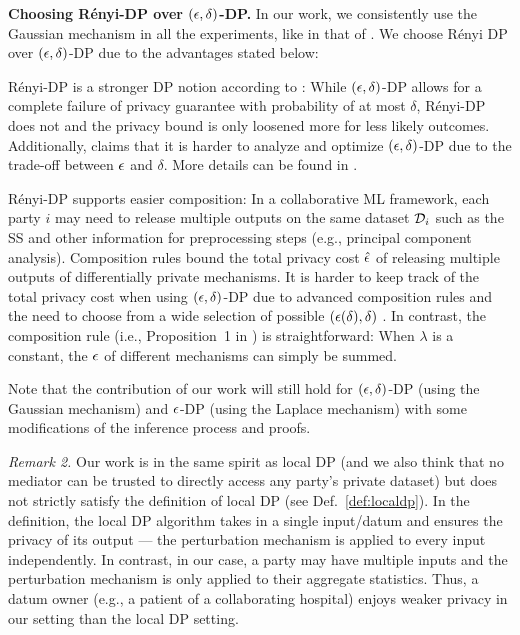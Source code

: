 \documentclass{article}
\theoremstyle{plain}
\theoremstyle{definition}
\theoremstyle{remark}
\renewcommand{\citet}[1]{\cite{#1}}
\begin{document}
\textbf{Choosing  R{\'e}nyi-DP over $({\epsilon}, \delta)$-DP.}
In our work, we consistently use the Gaussian mechanism in all the experiments, like in that of \citet{kulkarni2021glm}. We choose R{\'e}nyi DP over $({\epsilon}, \delta)$-DP due to the advantages stated below:

\squishlisttwo
    \item R{\'e}nyi-DP is a stronger DP notion according to \citet{mironov2017renyi}: While $({\epsilon}, \delta)$-DP allows for a complete failure of privacy guarantee with probability of at most $\delta$, R{\'e}nyi-DP does not and the privacy bound is only loosened more for less likely outcomes. Additionally, \citet{mironov2017renyi} claims that it is harder to analyze and optimize $({\epsilon}, \delta)$-DP due to the trade-off between ${\epsilon}$ and $\delta$. More details can be found in \cite{mironov2017renyi}.
    \item  R{\'e}nyi-DP supports easier composition: In a collaborative ML framework, each party $i$ may need to release multiple outputs on the same dataset ${\mathcal{D}}_i$ such as the SS and other information for preprocessing steps (e.g.,  principal component analysis). Composition rules bound the total privacy cost $\hat{{\epsilon}}$ of releasing multiple outputs of differentially private mechanisms. It is harder to keep track of the total privacy cost when using $({\epsilon}, \delta)$-DP due to advanced composition rules and the need to choose from a wide selection of possible $({\epsilon}(\delta), \delta)$  \cite{mironov2017renyi}. In contrast, the composition rule (i.e., Proposition~1 in \cite{mironov2017renyi}) is straightforward: When $\lambda$ is a constant, the ${\epsilon}$ of different mechanisms can simply be summed.
\squishend

Note that the contribution of our work will still hold for $({\epsilon}, \delta)$-DP (using the Gaussian mechanism) and ${\epsilon}$-DP (using the Laplace mechanism) with some modifications of the inference process and proofs.

\emph{Remark 2.} Our work is in the same spirit as local DP 
(and we also think that no mediator can be trusted to directly access any party's private dataset)
but does not strictly satisfy the definition of local DP (see Def.~\ref{def:localdp}). In the definition, the local DP algorithm takes in a single input/datum and ensures the privacy of its output --- the perturbation mechanism is applied to every input independently. In contrast, in our case, a party may have multiple inputs and the perturbation mechanism is only applied to their aggregate statistics.
Thus, a datum owner (e.g., a patient of a collaborating hospital) enjoys weaker privacy in our setting than the local DP setting.
\end{document}
